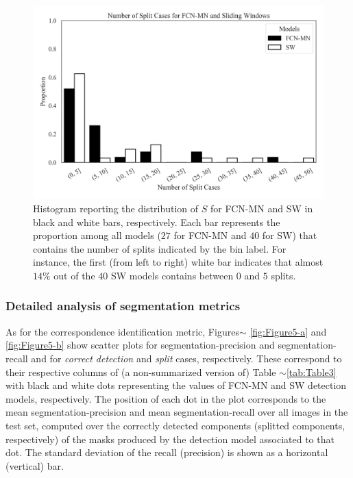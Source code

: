 \documentclass[a4paper,authoryear,review]{elsarticle}
\begin{document}
	
	\begin{figure}
		\centering
		\includegraphics[width=\textwidth]{figures/Figure4.png}
		\caption{
			Histogram reporting the distribution of $S$ for FCN-MN and SW in black and white bars, respectively. Each bar represents the proportion among all models ($27$ for FCN-MN  and $40$ for SW) that contains the number of splits indicated by the bin label. For instance, the first (from left to right) white bar indicates that almost $14\%$ out of the $40$ SW models contains between $0$ and $5$ splits.
		}
		\label{fig:Figure4}
	\end{figure}
	
	
	\subsubsection{Detailed analysis of segmentation metrics}
	
	As for the correspondence identification metric, Figures$\sim$ \ref{fig:Figure5-a} and \ref{fig:Figure5-b} show scatter plots for segmentation-precision and segmentation-recall and for \emph{correct detection} and \emph{split} cases, respectively. These correspond to their respective columns of (a non-summarized version of) Table $\sim$\ref{tab:Table3} with black and white dots representing the values of FCN-MN and SW detection models, respectively. The position of each dot in the plot corresponds to the mean segmentation-precision and mean segmentation-recall over all images in the test set, computed over the correctly detected components (splitted components, respectively) of the masks produced by the detection model associated to that dot. The standard deviation of the recall (precision) is shown as a horizontal (vertical) bar.
	
\end{document}
